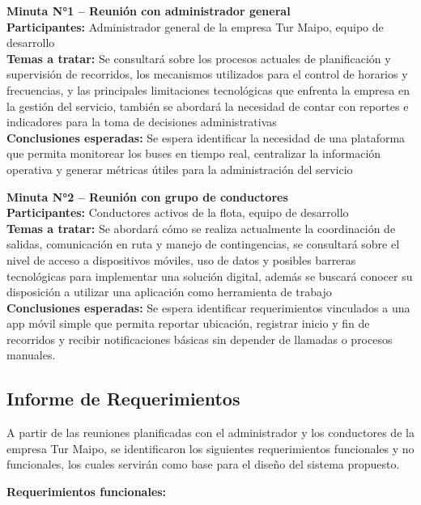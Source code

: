 \documentclass[12pt]{article}
\begin{document}
\textbf{Minuta N°1 – Reunión con administrador general} \\
\textbf{Participantes:} Administrador general de la empresa Tur Maipo, equipo de desarrollo \\
\textbf{Temas a tratar:} Se consultará sobre los procesos actuales de planificación y supervisión de recorridos, los mecanismos utilizados para el control de horarios y frecuencias, y las principales limitaciones tecnológicas que enfrenta la empresa en la gestión del servicio, también se abordará la necesidad de contar con reportes e indicadores para la toma de decisiones administrativas \\
\textbf{Conclusiones esperadas:} Se espera identificar la necesidad de una plataforma que permita monitorear los buses en tiempo real, centralizar la información operativa y generar métricas útiles para la administración del servicio

\vspace{0.3cm}

\textbf{Minuta N°2 – Reunión con grupo de conductores} \\
\textbf{Participantes:} Conductores activos de la flota, equipo de desarrollo \\
\textbf{Temas a tratar:} Se abordará cómo se realiza actualmente la coordinación de salidas, comunicación en ruta y manejo de contingencias, se consultará sobre el nivel de acceso a dispositivos móviles, uso de datos y posibles barreras tecnológicas para implementar una solución digital, además se buscará conocer su disposición a utilizar una aplicación como herramienta de trabajo \\
\textbf{Conclusiones esperadas:} Se espera identificar requerimientos vinculados a una app móvil simple que permita reportar ubicación, registrar inicio y fin de recorridos y recibir notificaciones básicas sin depender de llamadas o procesos manuales.

\newpage
\subsection{Informe de Requerimientos}
A partir de las reuniones planificadas con el administrador y los conductores de la empresa Tur Maipo, se identificaron los siguientes requerimientos funcionales y no funcionales, los cuales servirán como base para el diseño del sistema propuesto.

\textbf{Requerimientos funcionales:}
\end{document}
